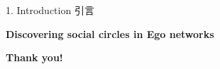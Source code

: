 \documentclass[CJKutf8]{beamer}
\begin{document}
\begin{CJK*}{UTF8}{gbsn}
\begin{frame}{1. Introduction 引言}
  \end{frame}


  \begin{frame}{\small{\bf{Discovering social circles in Ego networks}}}
    \begin{center}
      \Huge{\bf{Thank you!}}
    \end{center}
  \end{frame}


\end{CJK*}
\end{document}
